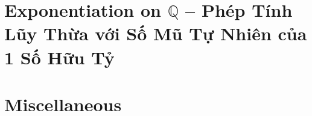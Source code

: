 \documentclass{article}
\begin{document}

\section{Exponentiation on $\mathbb{Q}$ -- Phép Tính Lũy Thừa với Số Mũ Tự Nhiên của 1 Số Hữu Tỷ}


\section{Miscellaneous}


\printbibliography[heading=bibintoc]
\end{document}
